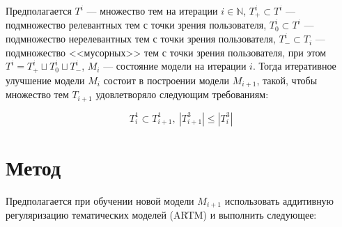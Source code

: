 \documentclass{article}
\begin{document}
Предполагается $T^i$ — множество тем на итерации $i \in \mathbb{N}$,  $T_+^i \subset T^i$ — подмножество релевантных тем с точки зрения пользователя, $T_0^i \subset T^i$ — подмножество нерелевантных тем с точки зрения пользователя, $T_-^i \subset T_i$ — подмножество <<мусорных>> тем с точки зрения пользователя, при этом $T^i = T_+^i \sqcup T_0^i \sqcup T_-^i$, $M_i$ — состояние модели на итерации $i$.
Тогда итеративное улучшение модели $M_i$ состоит в построении модели $M_{i + 1}$, такой, чтобы множество тем $T_{i + 1}$ удовлетворяло следующим требованиям:

$$T_i^1 \subset T_{i + 1}^1, \ \left| T_{i + 1}^3 \right| \leq \left| T_i^3 \right|$$

\section{Метод}

Предполагается при обучении новой модели $M_{i + 1}$ использовать аддитивную регуляризацию тематических моделей (ARTM) и выполнить следующее:
\end{document}
